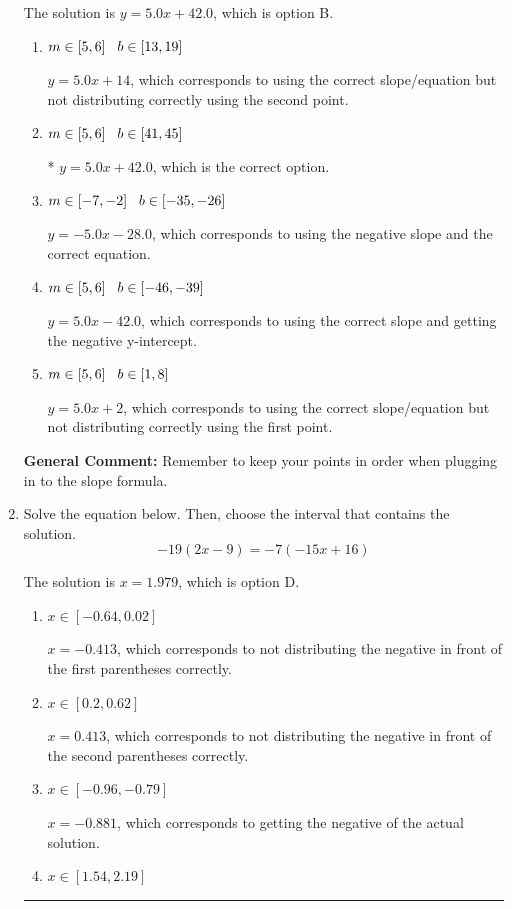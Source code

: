 \documentclass{extbook}[14pt]
\newcommand{\litem}[1]{\item #1

\rule{\textwidth}{0.4pt}}
\begin{document}
\begin{enumerate}
{The solution is \( y = 5.0x + 42.0 \), which is option B.\begin{enumerate}[label=\Alph*.]
\item \( m \in [5, 6] \hspace*{3mm} b \in [13, 19] \)

 $y = 5.0x + 14$, which corresponds to using the correct slope/equation but not distributing correctly using the second point.
\item \( m \in [5, 6] \hspace*{3mm} b \in [41, 45] \)

* $y = 5.0x + 42.0$, which is the correct option.
\item \( m \in [-7, -2] \hspace*{3mm} b \in [-35, -26] \)

 $y = -5.0x -28.0$, which corresponds to using the negative slope and the correct equation.
\item \( m \in [5, 6] \hspace*{3mm} b \in [-46, -39] \)

 $y = 5.0x -42.0$, which corresponds to using the correct slope and getting the negative y-intercept.
\item \( m \in [5, 6] \hspace*{3mm} b \in [1, 8] \)

 $y = 5.0x + 2$, which corresponds to using the correct slope/equation but not distributing correctly using the first point.
\end{enumerate}

\textbf{General Comment:} Remember to keep your points in order when plugging in to the slope formula.
}
\litem{
Solve the equation below. Then, choose the interval that contains the solution.
\[ -19(2x -9) = -7(-15x + 16) \]

The solution is \( x = 1.979 \), which is option D.\begin{enumerate}[label=\Alph*.]
\item \( x \in [-0.64, 0.02] \)

$x = -0.413$, which corresponds to not distributing the negative in front of the first parentheses correctly.
\item \( x \in [0.2, 0.62] \)

$x = 0.413$, which corresponds to not distributing the negative in front of the second parentheses correctly.
\item \( x \in [-0.96, -0.79] \)

$x = -0.881$, which corresponds to getting the negative of the actual solution.
\item \( x \in [1.54, 2.19] \)


\end{enumerate}}
\end{enumerate}
\end{document}
